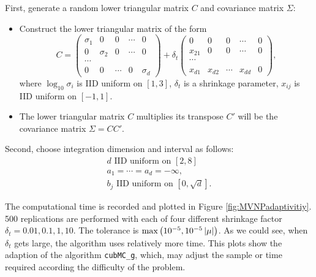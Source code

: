 \documentclass{iitthesis}
\theoremstyle{definition}
\begin{document}
First, generate a random lower triangular matrix $C$ and covariance matrix $\Sigma$:
\begin{itemize}
\item Construct the lower triangular matrix of the form
\begin{equation}\label{lowertrimatrixC}
C = \left (\begin{array}{ccccc}
\sigma_1&0&0&\cdots&0\\
0&\sigma_2&0& \cdots &0 \\
\cdots\\
0&0&\cdots&0&\sigma_d \end{array}\right)+\delta_t  \left (\begin{array}{ccccc}
0&0&0&\cdots&0\\
x_{21}&0&0& \cdots &0 \\
\cdots\\
x_{d1}&x_{d2}&\cdots&x_{dd}&0 \end{array}\right), 
\end{equation}
where $\log_{10}\sigma_i$ is IID uniform on $[1,3]$, $\delta_t$ is a shrinkage parameter, $x_{ij}$ is IID uniform on $[-1,1]$.
\item The lower triangular matrix $C$ multiplies its transpose $C'$ will be the covariance matrix $\Sigma = CC'$.
\end{itemize}

Second, choose integration dimension and interval as follows:
\begin{subequations} \label{MVNPexp2param}
\begin{gather}
d \text{ IID uniform on } [2,8] \\
a_1=\cdots=a_d =-\infty,\\
b_j \text{ IID uniform on } \left[0,\sqrt{d} \right].
\end{gather}
\end{subequations}

The computational time is recorded and plotted in Figure \ref{fig:MVNPadaptivitiy}. 500 replications are performed with each of four different shrinkage factor $\delta_t =  0.01,0.1, 1, 10$. The tolerance is $ \max \left(10^{-5}, 10^{-5}\left \lvert \mu \right \rvert\right)$. As we could see, when $\delta_t$ gets large, the algorithm uses relatively more time. This plots show the adaption of the algorithm {\tt cubMC\_g}, which, may adjust the sample or time required according the difficulty of the problem.


\label{chapter:meanMCberg}
\end{document}
